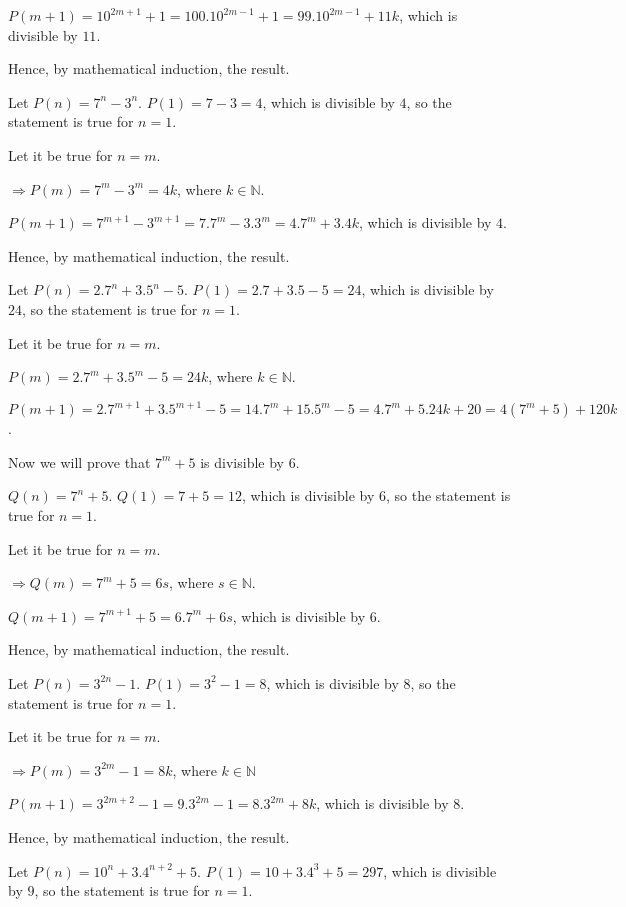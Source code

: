   $P(m + 1) = 10^{2m + 1} + 1 = 100.10^{2m - 1} + 1 = 99.10^{2m - 1} + 11k$, which is divisible by $11$.

  Hence, by mathematical induction, the result.
\item Let $P(n) = 7^n - 3^n$. $P(1) = 7 - 3 = 4$, which is divisible by $4$, so the statement is true for $n
  = 1$.

  Let it be true for $n = m$.

  $\Rightarrow P(m) = 7^m - 3^m = 4k$, where $k\in\mathbb{N}$.

  $P(m + 1) = 7^{m + 1} - 3^{m + 1} = 7.7^m - 3.3^m = 4.7^m + 3.4k$, which is divisible by $4$.

  Hence, by mathematical induction, the result.
\item Let $P(n) = 2.7^n + 3.5^n - 5$. $P(1) = 2.7 + 3.5 - 5 = 24$, which is divisible by $24$, so the
  statement is true for $n = 1$.

  Let it be true for $n = m$.

  $P(m) = 2.7^m + 3.5^m - 5 = 24k$, where $k\in\mathbb{N}$.

  $P(m + 1) = 2.7^{m  + 1} + 3.5^{m + 1} - 5 = 14.7^m + 15.5^m - 5 =  4.7^m + 5.24k + 20 = 4(7^m + 5) +
  120k$.

  Now we will prove that $7^m + 5$ is divisible by $6$.

  $Q(n) = 7^n + 5$. $Q(1)= 7 + 5 = 12$, which is divisible by $6$, so the statement is true for $n = 1$.

  Let it be true for $n = m$.

  $\Rightarrow Q(m) = 7^m + 5 = 6s$, where $s\in\mathbb{N}$.

  $Q(m + 1) = 7^{m + 1} + 5 = 6.7^m + 6s$, which is divisible by $6$.

  Hence, by mathematical induction, the result.
\item Let $P(n) = 3^{2n} - 1$. $P(1) = 3^2 - 1 = 8$, which is divisible by $8$, so the statement is true for
  $n = 1$.

  Let it be true for $n = m$.

  $\Rightarrow P(m) = 3^{2m} - 1 = 8k$, where $k\in\mathbb{N}$

  $P(m + 1) = 3^{2m + 2} - 1 = 9.3^{2m} - 1 = 8.3^{2m} + 8k$, which is divisible by $8$.

  Hence, by mathematical induction, the result.
\item Let $P(n) = 10^n + 3.4^{n + 2} + 5$. $P(1) = 10 + 3.4^3 + 5 = 297$, which is divisible by $9$, so the
  statement is true for $n = 1$.

